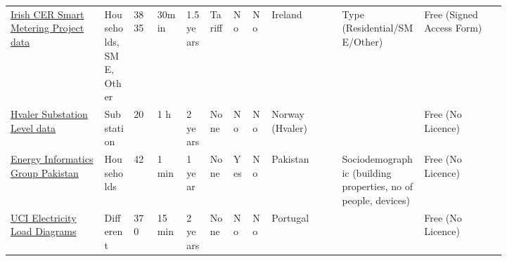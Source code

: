 \begin{sidewaystable*}
{\begin{tabular}{p{0.16\linewidth}p{0.05\linewidth}p{0.04\linewidth}p{0.05\linewidth}p{0.04\linewidth}p{0.04\linewidth}p{0.02\linewidth}p{0.02\linewidth}p{0.12\linewidth}p{0.14\linewidth}p{0.14\linewidth}}
			\href{http://www.ucd.ie/issda/data/commissionforenergyregulationcer/}{Irish CER Smart Metering Project data}~\cite{Commission2012csm} & Households, SME, Other & 3835  & 30min & 1.5 years & Tariff & No    & No    & Ireland & Type (Residential/SME/Other) & Free (Signed Access Form) \\
			
			\href{https://github.com/Nikasa1889/ShortTermLoadForecasting}{Hvaler Substation Level data}~\cite{DangHa2017lst} & Substation & 20    & 1 h   & 2 years & None  & No    & No    & Norway (Hvaler) &       & Free (No Licence) \\
			\href{http://web.lums.edu.pk/~eig/CXyzsMgyXGpW1sBo}{Energy Informatics Group Pakistan}~\cite{Pereira2014sap} & Households & 42    & 1 min & 1 year & None  & Yes   & No    & Pakistan & Sociodemographic (building properties, no of people, devices) & Free (No Licence) \\
			\href{https://archive.ics.uci.edu/ml/datasets/ElectricityLoadDiagrams20112014}{UCI Electricity Load Diagrams}~\cite{Godahewa2021ehd}
			& Different & 370   & 15 min & 2 years & None  & No    & No    & Portugal &       & Free (No Licence) \\
			

\end{tabular}}
\end{sidewaystable*}
